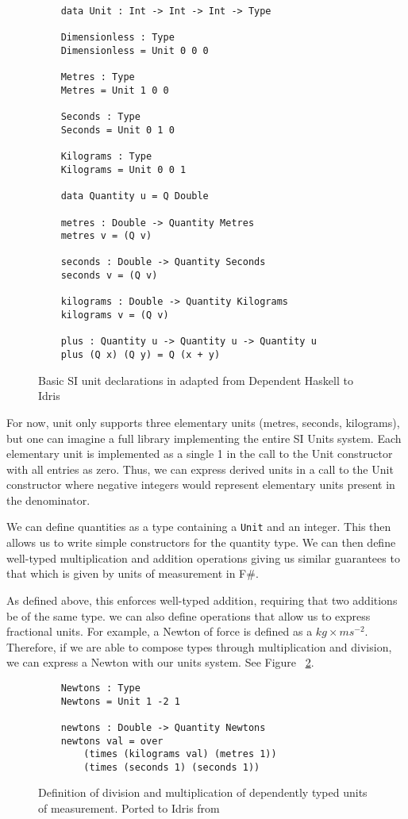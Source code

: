 \begin{figure}[h]
  \label{idris_code}
  \caption{Basic SI unit declarations in adapted from Dependent Haskell to Idris \cite{gundry2013}}
  \begin{lstlisting}
    data Unit : Int -> Int -> Int -> Type
    
    Dimensionless : Type
    Dimensionless = Unit 0 0 0
    
    Metres : Type
    Metres = Unit 1 0 0
    
    Seconds : Type
    Seconds = Unit 0 1 0
    
    Kilograms : Type
    Kilograms = Unit 0 0 1
    
    data Quantity u = Q Double
    
    metres : Double -> Quantity Metres
    metres v = (Q v)
    
    seconds : Double -> Quantity Seconds
    seconds v = (Q v)
    
    kilograms : Double -> Quantity Kilograms
    kilograms v = (Q v)
    
    plus : Quantity u -> Quantity u -> Quantity u
    plus (Q x) (Q y) = Q (x + y)
  \end{lstlisting}
\end{figure}

For now, unit only supports three elementary units (metres, seconds, kilograms),
but one can imagine a full library implementing the entire SI Units system. Each
elementary unit is implemented as a single 1 in the call to the Unit constructor
with all entries as zero. Thus, we can express derived units in a call to the
Unit constructor where negative integers would represent elementary units
present in the denominator. 

We can define quantities as a type containing a \texttt{Unit} and an integer.
This then allows us to write simple constructors for the quantity type. We can
then define well-typed multiplication and addition operations giving us similar
guarantees to that which is given by units of measurement in F\#. 

As defined above, this enforces well-typed addition, requiring that two
additions be of the same type. we can also define operations that allow us to
express fractional units. For example, a Newton of force is defined as a
$kg\times ms^{-2}$. Therefore, if we are able to compose types through
multiplication and division, we can express a Newton with our units system. See
Figure ~\ref{division}. 

\begin{figure}[h]
  \caption{Definition of division and multiplication of dependently typed units
  of measurement. Ported to Idris from \cite{gundry2013}}
  \label{division}
  \begin{lstlisting}
    Newtons : Type
    Newtons = Unit 1 -2 1

    newtons : Double -> Quantity Newtons
    newtons val = over 
        (times (kilograms val) (metres 1)) 
        (times (seconds 1) (seconds 1))
  \end{lstlisting}
\end{figure}


